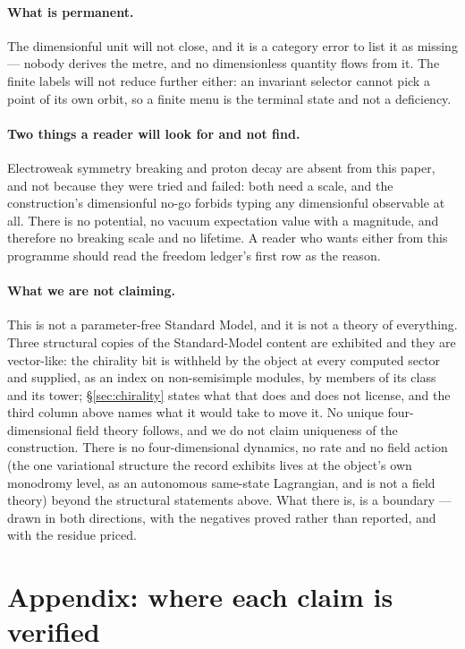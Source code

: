 \documentclass[11pt,a4paper]{article}
\theoremstyle{definition}
\theoremstyle{remark}
\begin{document}
\paragraph{What is permanent.} The dimensionful unit will not close, and it is a category error to
list it as missing --- nobody derives the metre, and no dimensionless quantity flows from it. The
finite labels will not reduce further either: an invariant selector cannot pick a point of its own
orbit, so a finite menu is the terminal state and not a deficiency.

\paragraph{Two things a reader will look for and not find.} Electroweak symmetry breaking and proton decay are
absent from this paper, and not because they were tried and failed: both need a scale, and the construction's
dimensionful no-go forbids typing any dimensionful observable at all. There is no potential, no vacuum expectation
value with a magnitude, and therefore no breaking scale and no lifetime. A reader who wants either from this
programme should read the freedom ledger's first row as the reason.

\paragraph{What we are not claiming.} This is not a parameter-free Standard Model, and it is not a
theory of everything. Three structural copies of the Standard-Model content are exhibited and they are vector-like: the chirality bit is withheld by the object at every computed sector and supplied, as an index on non-semisimple modules, by members of its class and its tower; \S\ref{sec:chirality} states what that does and does not license, and the third column above names what it would take to move it. No unique four-dimensional field
theory follows, and we do not claim uniqueness of the construction. There is no four-dimensional dynamics, no rate and no field action (the one variational structure the record exhibits lives at the object's own monodromy level, as an autonomous same-state Lagrangian, and is not a field theory)
beyond the structural statements above. What there is, is a boundary --- drawn in both directions,
with the negatives proved rather than reported, and with the residue priced.


\section*{Appendix: where each claim is verified}\label{sec:provenance}
\end{document}
